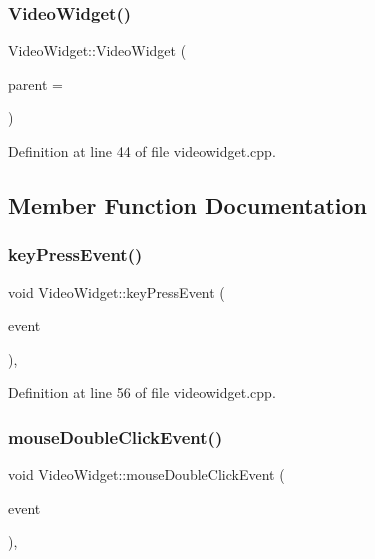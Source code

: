 \subsubsection{\texorpdfstring{Video\+Widget()}{VideoWidget()}}
{\footnotesize\ttfamily Video\+Widget\+::\+Video\+Widget (\begin{DoxyParamCaption}\item[{Q\+Widget $\ast$}]{parent = {} }\end{DoxyParamCaption})}



Definition at line 44 of file videowidget.\+cpp.



\subsection{Member Function Documentation}
\mbox{\label{class_video_widget_a3efa34386c146603fd2785409eab9d0f}} 
\subsubsection{\texorpdfstring{key\+Press\+Event()}{keyPressEvent()}}
{\footnotesize\ttfamily void Video\+Widget\+::key\+Press\+Event (\begin{DoxyParamCaption}\item[{Q\+Key\+Event $\ast$}]{event }\end{DoxyParamCaption})\hspace{0.3cm}{\ttfamily [override]}, {\ttfamily [protected]}}



Definition at line 56 of file videowidget.\+cpp.

\mbox{\label{class_video_widget_aff7ceebcce6eacc04cfbed16cb417158}} 
\subsubsection{\texorpdfstring{mouse\+Double\+Click\+Event()}{mouseDoubleClickEvent()}}
{\footnotesize\ttfamily void Video\+Widget\+::mouse\+Double\+Click\+Event (\begin{DoxyParamCaption}\item[{Q\+Mouse\+Event $\ast$}]{event }\end{DoxyParamCaption})\hspace{0.3cm}{\ttfamily [override]}, {\ttfamily [protected]}}



